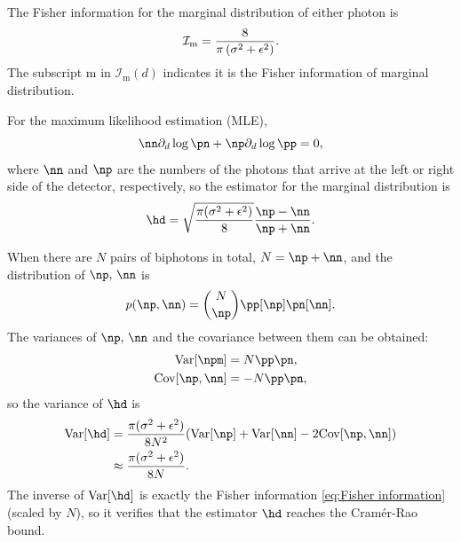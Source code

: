 The Fisher information for the marginal distribution of either photon
is
\begin{equation}
\mathcal{I}_\mathrm{m}=\frac{8}{\pi\left(\sigma^{2}+\epsilon^{2}\right)}.\label{eq:Fisher information}
\end{equation}
The subscript m in $\mathcal{I}_\textrm{m}(d)$ indicates it is the Fisher information of marginal distribution.


For the maximum likelihood estimation (MLE),
\begin{equation}
\nn\pd\log\pn+\np\pd\log\pp=0,
\end{equation}
where $\nn$ and $\np$ are the numbers of the photons that arrive at the left or right side of the detector, respectively, so the estimator for the marginal distribution is
\begin{equation}
\hd=\sqrt{\frac{\pi(\sigma^{2}+\epsilon^{2})}{8}}\frac{\np-\nn}{\np+\nn}.
\end{equation}


When there are $N$ pairs of biphotons in total, $N=\np+\nn$,
and the distribution of $\np,\,\nn$ is
\begin{equation}
p(\np,\nn)=\binom{N}{\np}\pp[\np]\pn[\nn].
\end{equation}
The variances of $\np,\,\nn$ and the covariance between them can be obtained:
\begin{equation}
\begin{aligned}\var{\npm} & =N\pp\pn,\\
\cov{\np,\nn} & =-N\pp\pn,
\end{aligned}
\end{equation}
so the variance of $\hd$ is
\begin{equation}
\begin{aligned}\var{\hd} & =\frac{\pi(\sigma^{2}+\epsilon^{2})}{8N^{2}}(\var{\np}+\var{\nn}-2\cov{\np,\nn})\\
 & \approx\frac{\pi(\sigma^{2}+\epsilon^{2})}{8N}.
\end{aligned}
\end{equation}
The inverse of $\var{\hd}$ is exactly the Fisher information \eqref{eq:Fisher information}
(scaled by $N$), so it verifies that the estimator $\hd$ reaches
the Cram\'er-Rao bound.

